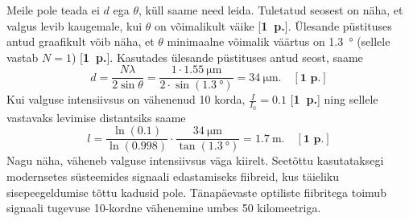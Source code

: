 \documentclass[12pt,a5paper]{article}
\newcommand{\pp}[1]{[\textbf{#1~p.}]}
\begin{document}
Meile pole teada ei $d$ ega $\theta$, küll saame need leida. Tuletatud seosest on näha, et valgus levib kaugemale, kui $\theta$ on võimalikult väike \pp{1}. Ülesande püstituses antud graafikult võib näha, et $\theta$ minimaalne võimalik väärtus on \SI{1.3}{\degree} (sellele vastab $N=1$) \pp{1}. Kasutades ülesande püstituses antud seost, saame
$$d = \frac{N\lambda}{2\sin\theta}=\frac{1\cdot\SI{1.55}{\micro\m}}{2\cdot\sin(\SI{1.3}{\degree})}=\SI{34}{\micro\m}. \quad \pp{1}$$
Kui valguse intensiivsus on vähenenud 10 korda, $\frac{I}{I_0}=0.1$ \pp{1} ning sellele vastavaks levimise distantsiks saame
$$l=\frac{\ln(\num{0.1})}{\ln(\num{0.998})}\cdot\frac{\SI{34}{\micro\m}}{\tan(\SI{1.3}{\degree})}=\SI{1.7}{\m}. \quad \pp{1}$$
Nagu näha, väheneb valguse intensiivsus väga kiirelt. Seetõttu kasutataksegi modernsetes süsteemides signaali edastamiseks fiibreid, kus täieliku sisepeegeldumise tõttu kadusid pole. Tänapäevaste optiliste fiibritega toimub signaali tugevuse 10-kordne vähenemine umbes 50 kilomeetriga.
\end{document}
